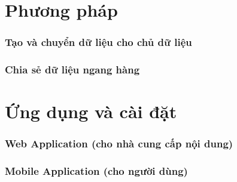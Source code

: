 \chapter{Phương pháp}
\subsection{Tạo và chuyển dữ liệu cho chủ dữ liệu}

\subsection{Chia sẻ dữ liệu ngang hàng}

\chapter{Ứng dụng và cài đặt}
\subsection{Web Application (cho nhà cung cấp nội dung)}

\subsection{Mobile Application (cho người dùng)}